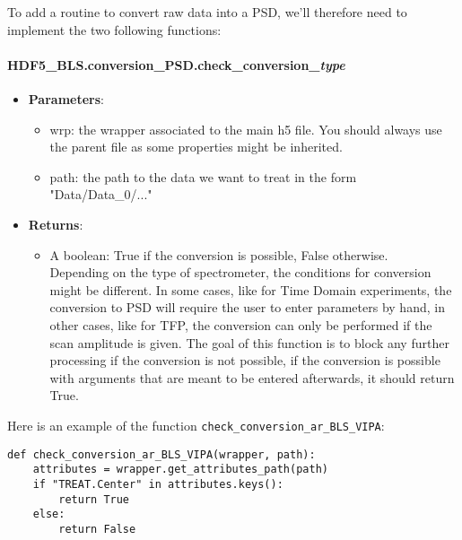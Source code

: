 To add a routine to convert raw data into a PSD, we'll therefore need to implement the two following functions:
\begin{tcolorbox}
    \paragraph{HDF5\_BLS.conversion\_PSD.check\_conversion\_\textit{type}}
    \begin{itemize}
        \item \textbf{Parameters}:
        \begin{itemize}
            \item wrp: the wrapper associated to the main h5 file. You should always use the parent file as some properties might be inherited.
            \item path: the path to the data we want to treat in the form "Data/Data\_0/..."
        \end{itemize} 
        \item \textbf{Returns}:
        \begin{itemize}
            \item A boolean: True if the conversion is possible, False otherwise. \\
            Depending on the type of spectrometer, the conditions for conversion might be different. In some cases, like for Time Domain experiments, the conversion to PSD will require the user to enter parameters by hand, in other cases, like for TFP, the conversion can only be performed if the scan amplitude is given. The goal of this function is to block any further processing if the conversion is not possible, if the conversion is possible with arguments that are meant to be entered afterwards, it should return True.
        \end{itemize} 
    \end{itemize}
\end{tcolorbox}

Here is an example of the function \texttt{check\_conversion\_ar\_BLS\_VIPA}:
\begin{lstlisting}
def check_conversion_ar_BLS_VIPA(wrapper, path):
    attributes = wrapper.get_attributes_path(path)
    if "TREAT.Center" in attributes.keys():
        return True
    else:
        return False
\end{lstlisting}


